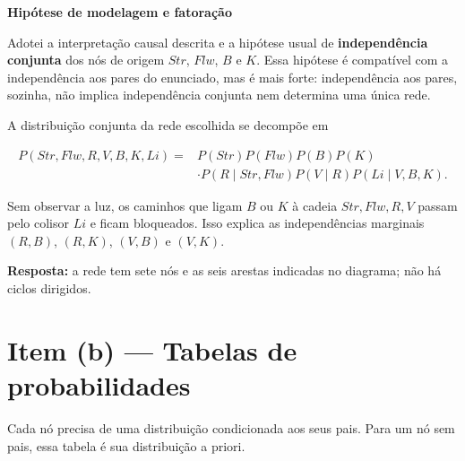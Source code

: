 \documentclass[11pt,a4paper]{article}
\newcommand{\itemtitle}[2]{\section*{\textcolor{accent}{Item (#1) --- #2}}}
\newcommand{\subtitulo}[1]{\par\medskip\textbf{\textcolor{accent}{#1}}\par}
\begin{document}
\subtitulo{Hipótese de modelagem e fatoração}\label{hipuxf3tese-de-modelagem-e-fatorauxe7uxe3o}

Adotei a interpretação causal descrita e a hipótese usual de \textbf{independência conjunta} dos nós de origem \(Str\), \(Flw\), \(B\) e \(K\). Essa hipótese é compatível com a independência aos pares do enunciado, mas é mais forte: independência aos pares, sozinha, não implica independência conjunta nem determina uma única rede.

A distribuição conjunta da rede escolhida se decompõe em

\[
\begin{aligned}
P(Str,Flw,R,V,B,K,Li)
={}&P(Str)P(Flw)P(B)P(K)\\
&\cdot P(R\mid Str,Flw)P(V\mid R)P(Li\mid V,B,K).
\end{aligned}
\]

Sem observar a luz, os caminhos que ligam \(B\) ou \(K\) à cadeia \(Str,Flw,R,V\) passam pelo colisor \(Li\) e ficam bloqueados. Isso explica as independências marginais \((R,B)\), \((R,K)\), \((V,B)\) e \((V,K)\).

\textbf{Resposta:} a rede tem sete nós e as seis arestas indicadas no diagrama; não há ciclos dirigidos.

\clearpage
\itemtitle{b}{Tabelas de probabilidades}\label{item-b}

Cada nó precisa de uma distribuição condicionada aos seus pais. Para um nó sem pais, essa tabela é sua distribuição a priori.

\begin{center}
\end{center}
\end{document}

